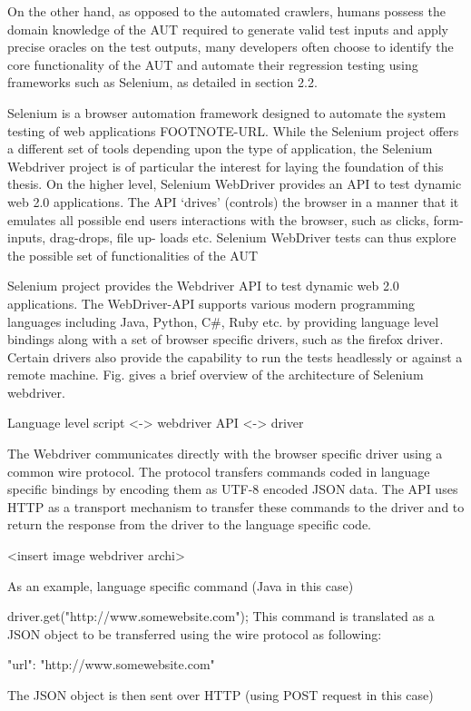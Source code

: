On the other hand, as opposed to the automated crawlers, humans possess the domain knowledge of the AUT required to generate valid test inputs and apply precise oracles on the test outputs, many developers often choose to identify the core functionality of the AUT and automate their regression testing using frameworks such as  Selenium, as detailed in section 2.2.

Selenium is a browser automation framework designed to automate the system testing of web applications FOOTNOTE-URL. While the Selenium project offers a different set of tools depending upon the type of application, the Selenium Webdriver project is of particular the interest for laying the foundation of this thesis. On the higher level, Selenium WebDriver provides an API to test dynamic web 2.0 applications. The API ‘drives’ (controls) the browser in a manner that it emulates all possible end users interactions with the browser, such as clicks, form-inputs, drag-drops, file up- loads etc. Selenium WebDriver tests can thus explore the possible set of functionalities of the AUT 

Selenium project provides the Webdriver API to test dynamic web 2.0 applications. The WebDriver-API supports various modern programming languages including Java, Python, C\#, Ruby etc. by providing language level bindings along with a set of browser specific drivers, such as the firefox driver. Certain drivers also provide the capability to run the tests headlessly or against a remote machine. Fig. gives a brief overview of the architecture of Selenium webdriver. 

Language level script <-> webdriver API <-> driver

The Webdriver communicates directly with the browser specific driver using a common wire protocol. The protocol transfers commands coded in language specific bindings by encoding them as UTF-8 encoded JSON data. The API uses  HTTP as a transport mechanism to transfer these commands to the driver and to return the response from the driver to the language specific code. 

<insert image webdriver archi>

As an example, 
language specific command (Java in this case) 

driver.get("http://www.somewebsite.com");
This command is translated as a JSON object to be transferred using the wire protocol as following: 

{"url": "http://www.somewebsite.com" }

The JSON object is then sent over HTTP (using POST request in this case)

